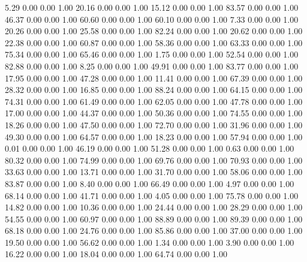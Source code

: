     5.29   0.00   0.00   1.00
   20.16   0.00   0.00   1.00
   15.12   0.00   0.00   1.00
   83.57   0.00   0.00   1.00
   46.37   0.00   0.00   1.00
   60.60   0.00   0.00   1.00
   60.10   0.00   0.00   1.00
    7.33   0.00   0.00   1.00
   20.26   0.00   0.00   1.00
   25.58   0.00   0.00   1.00
   82.24   0.00   0.00   1.00
   20.62   0.00   0.00   1.00
   22.38   0.00   0.00   1.00
   60.87   0.00   0.00   1.00
   58.36   0.00   0.00   1.00
   63.33   0.00   0.00   1.00
   75.34   0.00   0.00   1.00
   65.46   0.00   0.00   1.00
    1.75   0.00   0.00   1.00
   52.54   0.00   0.00   1.00
   82.88   0.00   0.00   1.00
    8.25   0.00   0.00   1.00
   49.91   0.00   0.00   1.00
   83.77   0.00   0.00   1.00
   17.95   0.00   0.00   1.00
   47.28   0.00   0.00   1.00
   11.41   0.00   0.00   1.00
   67.39   0.00   0.00   1.00
   28.32   0.00   0.00   1.00
   16.85   0.00   0.00   1.00
   88.24   0.00   0.00   1.00
   64.15   0.00   0.00   1.00
   74.31   0.00   0.00   1.00
   61.49   0.00   0.00   1.00
   62.05   0.00   0.00   1.00
   47.78   0.00   0.00   1.00
   17.00   0.00   0.00   1.00
   44.37   0.00   0.00   1.00
   50.36   0.00   0.00   1.00
   74.55   0.00   0.00   1.00
   18.26   0.00   0.00   1.00
   47.50   0.00   0.00   1.00
   72.70   0.00   0.00   1.00
   31.96   0.00   0.00   1.00
   49.30   0.00   0.00   1.00
   64.57   0.00   0.00   1.00
   18.23   0.00   0.00   1.00
   57.94   0.00   0.00   1.00
    0.01   0.00   0.00   1.00
   46.19   0.00   0.00   1.00
   51.28   0.00   0.00   1.00
    0.63   0.00   0.00   1.00
   80.32   0.00   0.00   1.00
   74.99   0.00   0.00   1.00
   69.76   0.00   0.00   1.00
   70.93   0.00   0.00   1.00
   33.63   0.00   0.00   1.00
   13.71   0.00   0.00   1.00
   31.70   0.00   0.00   1.00
   58.06   0.00   0.00   1.00
   83.87   0.00   0.00   1.00
    8.40   0.00   0.00   1.00
   66.49   0.00   0.00   1.00
    4.97   0.00   0.00   1.00
   68.14   0.00   0.00   1.00
   41.71   0.00   0.00   1.00
    4.05   0.00   0.00   1.00
   75.78   0.00   0.00   1.00
   14.82   0.00   0.00   1.00
   10.36   0.00   0.00   1.00
   24.44   0.00   0.00   1.00
   28.29   0.00   0.00   1.00
   54.55   0.00   0.00   1.00
   60.97   0.00   0.00   1.00
   88.89   0.00   0.00   1.00
   89.39   0.00   0.00   1.00
   68.18   0.00   0.00   1.00
   24.76   0.00   0.00   1.00
   85.86   0.00   0.00   1.00
   37.00   0.00   0.00   1.00
   19.50   0.00   0.00   1.00
   56.62   0.00   0.00   1.00
    1.34   0.00   0.00   1.00
    3.90   0.00   0.00   1.00
   16.22   0.00   0.00   1.00
   18.04   0.00   0.00   1.00
   64.74   0.00   0.00   1.00
